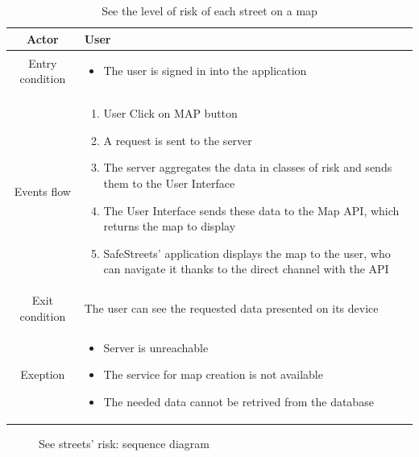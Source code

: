 \documentclass{article}
\begin{document}
		\begin{table} [H]
		\begin{center}
		\caption{See the level of risk of each street on a map}
		\begin{tabular}{|c|p{8cm}|}
			\hline
			Actor			&	User\\
			\hline
			Entry condition	&	\begin{itemize}[noitemsep,topsep=0pt]
								\item The user is signed in into the application
								\end{itemize}\\
			\hline
			 Events flow		&	\begin{enumerate}[noitemsep,topsep=0pt]
									\item User Click on MAP button			
									\item A request is sent to the server
									\item The server aggregates the data in classes of risk
									and sends them to the User Interface
									\item The User Interface sends these data to the Map API,
									which returns the map to display
									\item SafeStreets' application displays the map to 
									the user, who can navigate it thanks to the direct
									channel with the API
								\end{enumerate}\\
			\hline
			Exit condition 	&	The user can see the requested data presented on its device\\
			\hline
			Exeption			&	\begin{itemize}[noitemsep,topsep=0pt]
									\item Server is unreachable
									\item The service for map creation is not available
									\item The needed data cannot be retrived from the database
								\end{itemize}\\
			\hline
		\end{tabular}
		\end{center}
		\end{table} 
	\begin{figure}[H]
			\def\svgwidth{\columnwidth}
			
			\caption{See streets' risk: sequence diagram}
	\end{figure}
		
\end{document}
